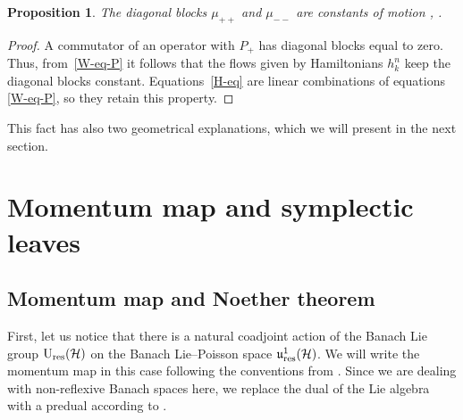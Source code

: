 \documentclass[10pt,a4paper]{amsart}
\newtheorem{prop}[thm]{Proposition}
\theoremstyle{definition}
\numberwithin{equation}{section}
\renewcommand{\H}{\mathcal{H}}
\newcommand{\Ur}{\mathrm{U}_{\textnormal{res}}(\H)}
\newcommand{\urp}{\mathfrak u_{\textnormal{res}}^1(\H)}
\begin{document}
\begin{prop}\label{prop:diag-const}
The diagonal blocks $\mu_{++}$ and $\mu_{--}$ are constants of motion
, .
\end{prop}
\begin{proof}
A commutator of an operator with $P_+$ has diagonal blocks equal to zero. Thus, from~\eqref{W-eq-P} it follows that the flows given by Hamiltonians $h^n_k$ keep the diagonal blocks constant.
Equations~\eqref{H-eq} are linear combinations of equations \eqref{W-eq-P}, so they retain this property.
\end{proof}

This fact has also two geometrical explanations, which we will present in the next section.

\section{Momentum map and symplectic leaves}\label{sec:momentum}

\subsection{Momentum map and Noether theorem}
First, let us notice that there is a natural coadjoint action of the Banach Lie group $\Ur$ on the Banach Lie--Poisson space $\urp$. We will write the momentum map in this case following the conventions from \cite[Definition 11.2.1]{ratiu-ms}. Since we are dealing with non-reflexive Banach spaces here, we replace the dual of the Lie algebra with a predual according to \cite[Definition~8.1]{OR}.
\end{document}
